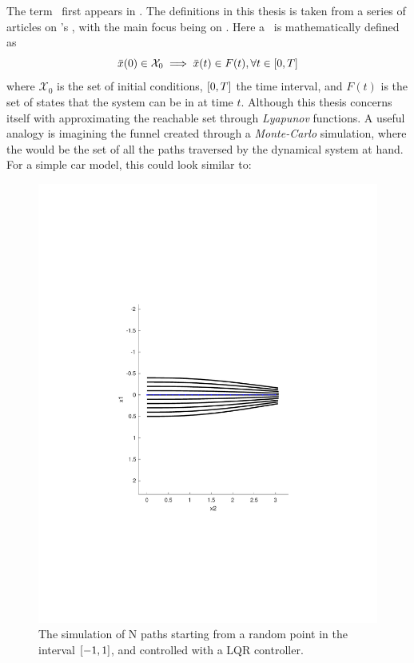 The term \funnel\ first appears in \cite{masonMechanicsManipulation1985}. The
\funnel{} definitions in this thesis is taken from a series of articles on
\funnel{}'s \cite{tobenkinInvariantFunnelsTrajectories2010}
\cite{tedrakeLQRtreesFeedbackMotion2009} \cite{majumdarRobustOnlineMotion2013}
\cite{majumdarFunnelLibrariesRealtime2017}
\cite{ahmadiDSOSSDSOSOptimization2017}, with the main focus being on
\cite{majumdarFunnelLibrariesRealtime2017}. Here a \funnel\ is mathematically
defined as
\[
  \bar{x}(0) \in \mathcal{X}_0 \implies \bar{x}(t) \in F(t), \forall t \in
  \lbrack0,T\rbrack
\]
where \(\mathcal{X}_0\) is the set of initial conditions, \(\lbrack0,T\rbrack\) the time
interval, and \(F(t)\) is the set of states that the system can be in at time
\(t\). Although this thesis concerns itself with approximating the reachable set
through \textit{Lyapunov} functions. A useful analogy is imagining the funnel
created through a \textit{Monte-Carlo} simulation, where the \funnel{} would be
the set of all the paths traversed by the dynamical system at hand. For a simple
car model, this could look similar to:

\begin{figure}
  \includegraphics[scale=.5]{figures/preliminaries/montecarlofunnel}
  \caption{The simulation of N paths starting from a random point in the
    interval \(\lbrack-1,1\rbrack\), and controlled with a LQR controller.}
\end{figure}

